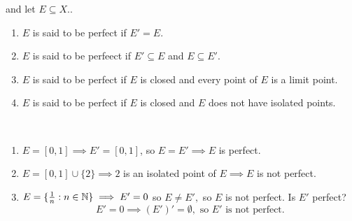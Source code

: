 \begin{definition}
    \routineMS and let $E\subseteq X.$.
    \begin{enumerate}[$(i)$]
        \item $E$ is said to be perfect if $E' = E$.
        \item $E$ is said to be perfeect if $E' \subseteq E$ and $E\subseteq E'$.
        \item $E$ is said to be perfect if $E$ is closed and every point of $E$ is a limit point.
        \item $E$ is said to be perfect if $E$ is closed and $E$ does not have isolated points.
    \end{enumerate}
\end{definition}

\begin{example} \leavevmode \\
    \begin{enumerate}[$*)$]
        \item $E=[0,1] \implies E' = [0,1]$, so $E=E' \implies E$ is perfect.
        \item $E=[0,1]\cup \{2\} \implies 2$ is an isolated point of $E \implies E$ is not perfect.
        \item $E=\{\frac{1}{n} : n\in \mathbb{N}\} \implies E' = {0}$ so $E \not = E',$ so $E$ is not perfect. Is $E'$ perfect?
        $$E' = {0} \implies (E')' = \emptyset, \text{ so $E'$ is not perfect.}$$
    \end{enumerate}
\end{example}

